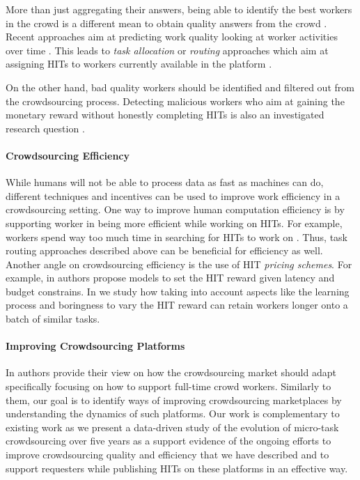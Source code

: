 More than just aggregating their answers,  being able to identify the best workers in the crowd is a different  mean to obtain quality answers from the crowd \cite{pickacrowd,bozzon}. 
% 
Recent approaches aim at predicting work quality looking at worker activities over time  \cite{Jung14-hcomp}.
% 
This leads to \emph{task allocation} or \emph{routing} approaches which aim at assigning HITs to  workers currently available in the platform \cite{goel2014mechanism,crowdstar}.

On the other hand, bad quality workers should be identified and filtered out from the crowdsourcing process.
Detecting malicious workers who aim at gaining the monetary reward without honestly  completing HITs is also an investigated research question \cite{collusion}.






\paragraph{Crowdsourcing Efficiency}
While humans will not be able to process data as fast as machines can do, different techniques and incentives can be used to improve work efficiency in a crowdsourcing setting.
% 
One way to improve human computation efficiency is by supporting worker in being more efficient while working on HITs. For example, workers spend way too much time in searching for HITs to work on \cite{Kucherbaev:2014:TET:2598153.2602249}. Thus, task routing approaches described above can be beneficial for efficiency as well.
% 
Another angle on crowdsourcing efficiency is the use of HIT \emph{pricing schemes}. For example, in \cite{finishthem} authors propose models to set the HIT reward given latency and budget constrains. In \cite{scaleup} we study how taking into account aspects like the learning process and boringness  to vary the HIT reward can retain workers longer onto a batch of similar tasks.






\paragraph{Improving Crowdsourcing Platforms}
In \cite{Kittur:2013:FCW:2441776.2441923} authors provide their view on how the crowdsourcing market should adapt specifically focusing on how to  support full-time crowd workers. Similarly to them, our goal is to identify ways of improving crowdsourcing marketplaces by understanding the dynamics of such platforms.
Our work is complementary to existing work as we present a data-driven study of the evolution of micro-task crowdsourcing over five years as a support evidence of the ongoing efforts to improve crowdsourcing quality and efficiency that we have described
and to support requesters while publishing HITs on these platforms in an effective way.




